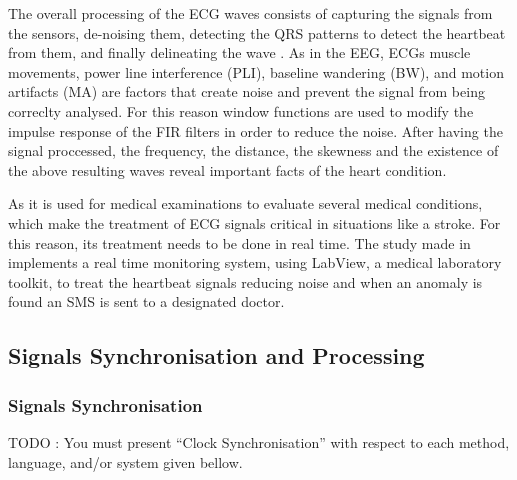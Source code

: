 The overall processing of the ECG waves consists of capturing the signals from the sensors, de-noising them, detecting the QRS patterns to detect the heartbeat from them, and finally delineating the wave \cite{ECGsignalprocc}.
As in the EEG, ECGs muscle movements, power line interference (PLI), baseline wandering (BW), and motion artifacts (MA) are factors that create noise and prevent the signal from being correclty analysed. For this reason window functions are used to modify the impulse response of the FIR filters in order to reduce the noise.  After having the signal proccessed, the frequency, the distance, the skewness and the existence of the above resulting waves reveal important facts of the heart condition.


As it is used for medical examinations to evaluate several medical conditions, which make the treatment of ECG signals critical in situations like a stroke. For this reason, its treatment needs to be done in real time. The study made in \cite{ECGsyc} implements a real time monitoring system, using LabView, a medical laboratory toolkit, to treat the heartbeat signals reducing noise and when an anomaly is found an SMS is sent to a designated doctor.


\subsection{Signals Synchronisation and Processing}






\subsubsection{Signals Synchronisation}

{\color{red}TODO : You must present ``Clock Synchronisation'' with respect to each method, language, and/or system given bellow.}

\bigskip

